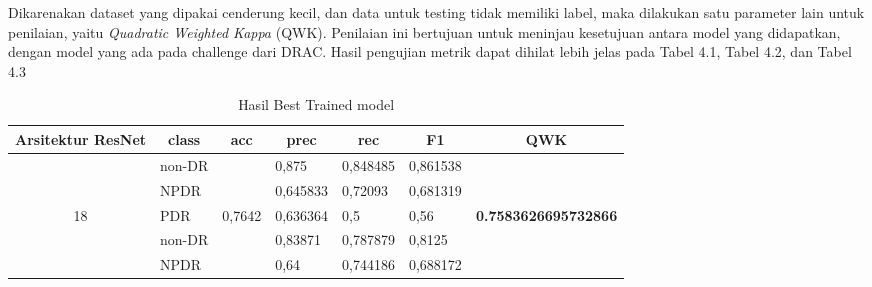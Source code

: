 Dikarenakan dataset yang dipakai cenderung kecil, dan data untuk testing tidak memiliki label, maka dilakukan satu parameter lain untuk penilaian, yaitu \emph{Quadratic Weighted Kappa} (QWK). Penilaian ini bertujuan untuk meninjau kesetujuan antara model yang didapatkan, dengan model yang ada pada challenge dari DRAC. Hasil pengujian metrik dapat dihilat lebih jelas pada Tabel 4.1, Tabel 4.2, dan Tabel 4.3

\pagebreak

\begin{table}[hbtp]
	\begin{center}
		\caption{Hasil Best Trained model}
		\label{tb:HasilTrainDefault}
		\begin{tabular}{|c|l|c|l|l|l|c|}
			\hline
			\rowcolor[HTML]{C0C0C0} 
			Arsitektur ResNet   & \multicolumn{1}{c|}{\cellcolor[HTML]{C0C0C0}class} & acc                      & \multicolumn{1}{c|}{\cellcolor[HTML]{C0C0C0}prec} & \multicolumn{1}{c|}{\cellcolor[HTML]{C0C0C0}rec} & \multicolumn{1}{c|}{\cellcolor[HTML]{C0C0C0}F1} & QWK                                  \\ \hline
			& non-DR                                             &                          & 0,875                                             & 0,848485                                         & 0,861538                                        &                                      \\ \cline{2-2} \cline{4-6}
			& NPDR                                               &                          & 0,645833                                          & 0,72093                                          & 0,681319                                        &                                      \\ \cline{2-2} \cline{4-6}
			\multirow{-3}{*}{18}  & PDR                                                & \multirow{-3}{*}{0,7642} & 0,636364                                          & 0,5                                              & 0,56                                            & \multirow{-3}{*}{\textbf{0.7583626695732866}} \\ \hline
			& non-DR                                             &                          & 0,83871                                           & 0,787879                                         & 0,8125                                          &                                      \\ \cline{2-2} \cline{4-6}
			& NPDR                                               &                          & 0,64                                              & 0,744186                                         & 0,688172                                        &                                      \\ \cline{2-2} \cline{4-6}

\end{tabular}
\end{center}
\end{table}

